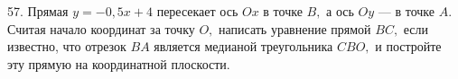 57. Прямая $y=-0,5x+4$ пересекает ось $Ox$ в точке $B,$ а ось $Oy$ --- в точке $A.$ Считая начало координат за точку $O,$ написать уравнение прямой $BC,$ если известно, что отрезок $BA$ является медианой треугольника $CBO,$ и постройте эту прямую на координатной плоскости.\\
